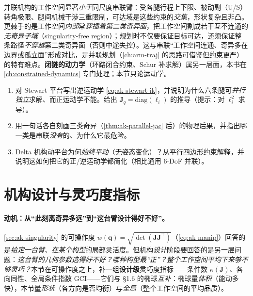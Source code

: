 \begin{note}\label{note:ak-parallel-ws}
并联机构的工作空间显著\emph{小于}同尺度串联臂\cite{siciliano2009robotics,merlet2006parallel}：受各腿行程上下限、被动副（U/S）转角极限、腿间机械干涉三重限制，可达域是这些约束的\emph{交集}，形状复杂且非凸。更棘手的是工作空间\emph{内部}常\emph{穿插着第二类奇异面}，把工作空间割成若干互不连通的\emph{无奇异子域}（singularity-free region）；规划时不仅要保证目标可达，还须保证整条路径\emph{不穿越}第二类奇异面（否则中途失控）。这与串联“工作空间连通、奇异多在边界或孤立面”形成对比，是并联规划（\cref{ch:arm-traj} 的思路可借鉴但约束更严）的特有难点。\textbf{闭链的动力学}（环路闭合约束、Schur 补求解）属另一层面，本书在 \cref{ch:constrained-dynamics} 专门处理；本节只论运动学。
\end{note}

\begin{practice}
\begin{enumerate}
  \item 对 Stewart 平台写出逆运动学 \cref{eq:ak-stewart-ik}，并说明为什么六条腿可\emph{并行独立}求解、而正运动学不能。给出 $\mathbf{J}_q=\mathrm{diag}(\ell_i)$ 的推导（提示：对 $\ell_i^2$ 求导）。
  \item 用一句话各自刻画三类奇异（\cref{thm:ak-parallel-jac} 后）的物理后果，并指出哪一类是串联\emph{没有}的、为什么它最危险。
  \item Delta 机构动平台为何\emph{始终平动}（无姿态变化）？从平行四边形约束解释，并说明这如何把它的正/逆运动学都简化（相比通用 6\nobreakdash-DoF 并联）。
\end{enumerate}
\end{practice}

\section{机构设计与灵巧度指标}
\label{sec:ak-design}

\paragraph{动机：从“此刻离奇异多远”到“这台臂设计得好不好”。}
\cref{sec:ak-singularity} 的可操作度 $w(\mathbf{q})=\sqrt{\det(\mathbf{J}\mathbf{J}^\top)}$（\cref{eq:ak-manip}）回答的是\emph{给定一台臂、在某个构型}的局部灵活度。但机构\emph{设计}阶段要回答的是另一层问题：\emph{这台臂的几何参数选得好不好？哪种构型最“正”？整个工作空间平均下来够不够灵巧？}本节在可操作度之上，补一组\textbf{设计级}灵巧度指标——条件数 $\kappa(\mathbf{J})$、各向同性、全局条件指数 GCI——它们与 §1.6 的椭球\emph{互补}：椭球量\emph{体积}（能动多快），本节量\emph{形状}（各方向是否均衡）与\emph{全局}（整个工作空间的平均品质）。

